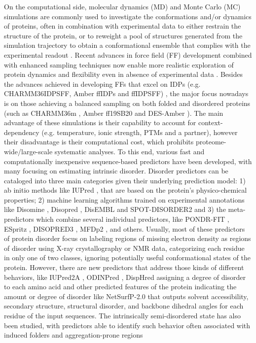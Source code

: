 On the computational side, molecular dynamics (MD) and Monte Carlo (MC) simulations are commonly used to investigate the conformations and/or dynamics of proteins, often in combination with experimental data to either restrain the structure of the protein, or to reweight a pool of structures generated from the simulation trajectory to obtain a conformational ensemble that complies with the experimental readout \cite{lindorff-larsen_simultaneous_2005, hummer_bayesian_2015, childers_validating_2018, orioli_how_2020}. Recent advances in force field (FF) development combined with enhanced sampling techniques now enable more realistic exploration of protein dynamics and flexibility even in absence of experimental data \cite{yang_enhanced_2019, abriata_assessment_2021}. Besides the advances achieved in developing FFs that excel on IDPs (e.g. CHARMM36IDPSFF, Amber ffIDPs and ffIDPSFF) \cite{huang_force_2018, zapletal_choice_2020, mu_recent_2021}, the major focus nowadays is on those achieving a balanced sampling on both folded and disordered proteins (such as CHARMM36m \cite{huang_charmm36m_2017}, Amber ff19SB20 and DES-Amber \cite{piana_development_2020}). The main advantage of these simulations is their capability to account for context-dependency (e.g. temperature, ionic strength, PTMs and a partner), however their disadvantage is their computational cost, which prohibits proteome-wide/large-scale systematic analyses. To this end, various fast and computationally inexpensive sequence-based predictors have been developed, with many focusing on estimating intrinsic disorder. Disorder predictors can be cataloged into three main categories given their underlying prediction model: 1) ab initio methods like IUPred \cite{dosztanyi_iupred_2005}, that are based on the protein’s physico-chemical properties; 2) machine learning algorithms trained on experimental annotations like Disomine \cite{orlando_prediction_2022}, Disopred \cite{ward_disopred_2004}, DisEMBL \cite{linding_protein_2003} and SPOT-DISORDER2 \cite{hanson_spot-disorder2_2019} and 3) the meta-predictors which combine several individual predictors, like PONDR-FIT \cite{xue_pondr-fit_2010}, ESpritz \cite{walsh_espritz_2012}, DISOPRED3 \cite{jones_disopred3_2015}, MFDp2 \cite{kihara_prediction_2014}, and others. Usually, most of these predictors of protein disorder focus on labeling regions of missing electron density as regions of disorder using X-ray crystallography or NMR data, categorizing each residue in only one of two classes, ignoring potentially useful conformational states of the protein. However, there are new predictors that address those kinds of different behaviors, like IUPred2A \cite{meszaros_iupred2a_2018}, ODINPred \cite{dass_odinpred_2020}, DispHred \cite{santos_disphred_2020} assigning a degree of disorder to each amino acid and other predicted features of the protein indicating the amount or degree of disorder like NetSurfP-2.0 \cite{klausen_netsurfp20_2019} that outputs solvent accessibility, secondary structure, structural disorder, and backbone dihedral angles for each residue of the input sequences. The intrinsically semi-disordered state has also been studied, with predictors able to identify such behavior often associated with induced folders and \gls{aggregation}-prone regions 